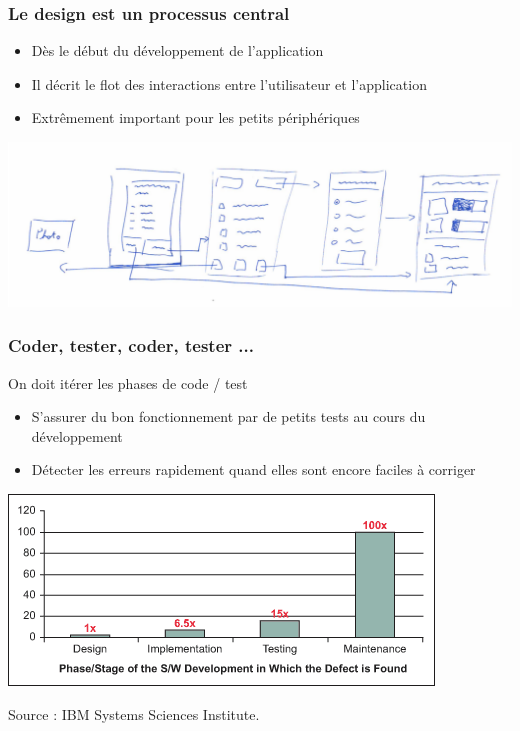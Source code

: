 \documentclass{beamer}
\begin{document}
\begin{frame}
\frametitle{Le design est un processus central}

\begin{itemize}
	\item Dès le début du développement de l'application
	\item Il décrit le flot des interactions entre l'utilisateur et l'application
	\item Extrêmement important pour les petits périphériques
\end{itemize}

\begin{center}
\includegraphics[scale=0.3]{design.png}
\end{center}
\end{frame}

\begin{frame}
\frametitle{Coder, tester, coder, tester ...}

\begin{block}{On doit itérer les phases de code / test}
\begin{itemize}
	\item S'assurer du bon fonctionnement par de petits tests au cours du développement
	\item Détecter les erreurs rapidement quand elles sont encore faciles à corriger
\end{itemize}
\end{block}
\begin{center}
\includegraphics[scale=0.5]{defect.png}

Source : IBM Systems Sciences Institute.
\end{center}
\end{frame}
\end{document}
